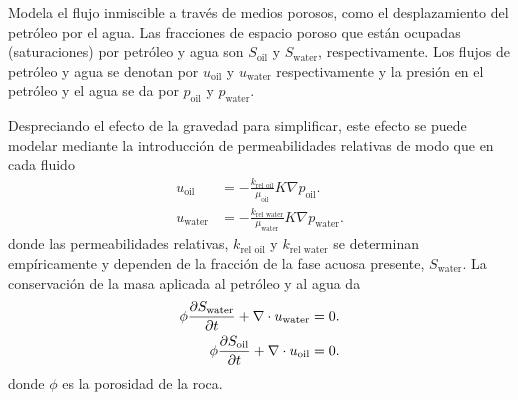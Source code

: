 \documentclass[
  aspectratio=1610,
  c,
  handout,
  9pt,
  spanish
]{beamer}
\begin{document}
\begin{frame}
    \frametitle{\secname}

    Modela el flujo inmiscible a través de medios porosos, como el
    desplazamiento del petróleo por el agua.
    Las fracciones de espacio poroso que están ocupadas
    (saturaciones) por petróleo y agua son $S_{\text{oil}}$ y
    $S_{\text{water}}$, respectivamente.
    Los flujos de petróleo y agua se denotan por $u_{\text{oil}}$ y
    $u_{\text{water}}$ respectivamente y la presión en el petróleo y
    el agua se da por $p_{\text{oil}}$ y $p_{\text{water}}$.

    Despreciando el efecto de la gravedad para simplificar, este
    efecto se puede modelar mediante la introducción de
    permeabilidades relativas de modo que en cada fluido
    \begin{align}
        u_{\text{oil}}   & =
        -\frac{k_{\text{rel oil}}}{\mu_{\text{oil}}}
        K\nabla p_{\text{oil}}. \\
        u_{\text{water}} & =
        -\frac{k_{\text{rel water}}}{\mu_{\text{water}}}
        K\nabla p_{\text{water}}.
    \end{align}
    donde las permeabilidades relativas, $k_{\text{rel oil}}$ y
    $k_{\text{rel water}}$ se determinan empíricamente y dependen de
    la fracción de la fase acuosa presente, $S_{\text{water}}$.
    La conservación de la masa aplicada al petróleo y al agua da
    \begin{align}
        \phi
        \diffp{S_{\text{water}}}{t}+
        \nabla\cdot u_{\text{water}} & =0. \\
        \phi
        \diffp{S_{\text{oil}}}{t}+
        \nabla\cdot u_{\text{oil}}   & =0.
    \end{align}
    donde $\phi$ es la porosidad de la roca.
\end{frame}
\end{document}
